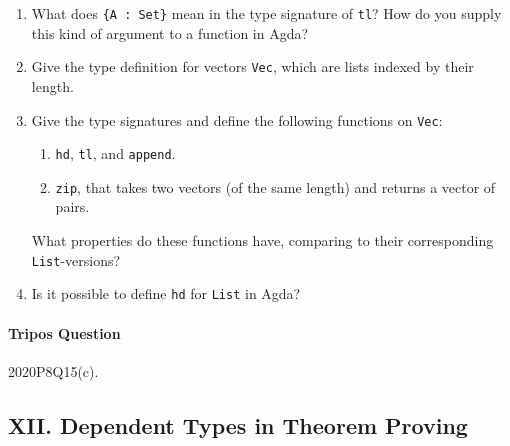 \documentclass[11pt,a4paper,twoside]{article}
\begin{document}
\begin{enumerate}[label=(\alph*)]
  \item What does \texttt{\{A : Set\}} mean in the type signature of \texttt{tl}?
  How do you supply this kind of argument to a function in Agda?

  \item Give the type definition for vectors \texttt{Vec}, 
  which are lists indexed by their length.

  \item Give the type signatures and define the following functions on \texttt{Vec}:
  \begin{enumerate}[label=(\roman*)]
    \item \texttt{hd}, \texttt{tl}, and \texttt{append}.
    \item \texttt{zip}, that takes two vectors (of the same length) and returns a vector of pairs.
  \end{enumerate}
  What properties do these functions have, comparing to their corresponding \texttt{List}-versions?

  \item Is it possible to define \texttt{hd} for \texttt{List} in Agda?
\end{enumerate}

\paragraph{Tripos Question} 2020P8Q15(c).

\subsection*{XII. Dependent Types in Theorem Proving}


\end{document}
